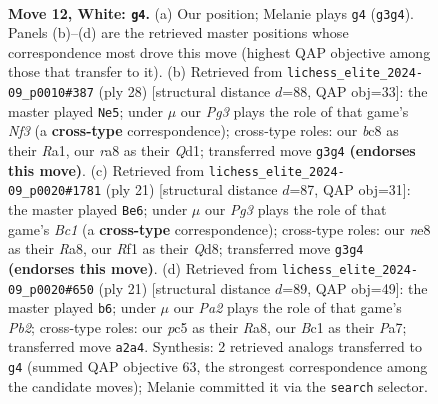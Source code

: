 \documentclass[11pt]{article}
\begin{document}
\clearpage

\begin{figure}[p]\centering
\begin{subfigure}{0.46\textwidth}\centering
\resizebox{\linewidth}{!}{%
\newchessgame
\chessboard[
  setfen={r1bqnr1k/pp1pppbp/8/2p2p2/2P5/2N3P1/PP1P1PBP/R1BQNRK1 w - - 0 12},
  showmover=false,
  pgfstyle=straightmove, color=movearrow, markmove={g3-g4}
]}
\caption{}
\end{subfigure}\hfill
\begin{subfigure}{0.46\textwidth}\centering
\resizebox{\linewidth}{!}{%
\newchessgame
\chessboard[
  setfen={r1bqr1k1/1p2ppb1/p1p2npp/2P5/3P4/5NP1/PP3PBP/R1BQ1RK1 w - - 0 15},
  showmover=false,
  pgfstyle=straightmove, color=movearrow, markmove={f3-e5}
]}
\caption{}
\end{subfigure}
\\[4pt]
\begin{subfigure}{0.46\textwidth}\centering
\resizebox{\linewidth}{!}{%
\newchessgame
\chessboard[
  setfen={r1bqk2r/pp2npbp/6p1/3p4/3P4/1B6/PP3PPP/RNBQR1K1 b kq - 0 11},
  showmover=false,
  pgfstyle=straightmove, color=movearrow, markmove={c8-e6}
]}
\caption{}
\end{subfigure}\hfill
\begin{subfigure}{0.46\textwidth}\centering
\resizebox{\linewidth}{!}{%
\newchessgame
\chessboard[
  setfen={r1bq1rk1/pp1pppbp/4n1p1/8/2P1P3/2N1B3/PP1QBPPP/R3K2R b KQ - 5 11},
  showmover=false,
  pgfstyle=straightmove, color=movearrow, markmove={b7-b6}
]}
\caption{}
\end{subfigure}
\caption{\textbf{Move 12, White: \texttt{g4}.} (a) Our position; Melanie plays \texttt{g4} (\texttt{g3g4}). Panels (b)--(d) are the retrieved master positions whose correspondence most drove this move (highest QAP objective among those that transfer to it). (b) Retrieved from \texttt{lichess\_elite\_2024-09\_p0010\#387} (ply 28) [structural distance $d$=88, QAP obj=33]: the master played \texttt{Ne5}; under $\mu$ our \emph{Pg3} plays the role of that game's \emph{Nf3} (a \textbf{cross-type} correspondence); cross-type roles: our \emph{b}c8 as their \emph{R}a1, our \emph{r}a8 as their \emph{Q}d1; transferred move \texttt{g3g4} \textbf{(endorses this move)}. (c) Retrieved from \texttt{lichess\_elite\_2024-09\_p0020\#1781} (ply 21) [structural distance $d$=87, QAP obj=31]: the master played \texttt{Be6}; under $\mu$ our \emph{Pg3} plays the role of that game's \emph{Bc1} (a \textbf{cross-type} correspondence); cross-type roles: our \emph{n}e8 as their \emph{R}a8, our \emph{R}f1 as their \emph{Q}d8; transferred move \texttt{g3g4} \textbf{(endorses this move)}. (d) Retrieved from \texttt{lichess\_elite\_2024-09\_p0020\#650} (ply 21) [structural distance $d$=89, QAP obj=49]: the master played \texttt{b6}; under $\mu$ our \emph{Pa2} plays the role of that game's \emph{Pb2}; cross-type roles: our \emph{p}c5 as their \emph{R}a8, our \emph{B}c1 as their \emph{P}a7; transferred move \texttt{a2a4}. Synthesis: 2 retrieved analogs transferred to \texttt{g4} (summed QAP objective 63, the strongest correspondence among the candidate moves); Melanie committed it via the \texttt{search} selector.}
\label{fig:thought-m22}
\end{figure}
\end{document}
